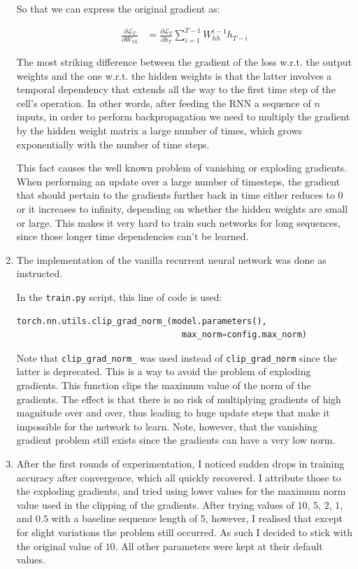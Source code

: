 \documentclass{article}
\newcommand{\del}[2]{\ensuremath{\frac{\partial #1}{\partial #2}}}
\newcommand{\Ell}{\ensuremath{\mathcal{L}}}
\begin{document}
\begin{enumerate}[label=\textbf{1.\arabic*}]
  So that we can express the original gradient as:

  \begin{align*}
    \del{\Ell_T}{W_{hh}} &= \del{\Ell_T}{h_T} \sum_{i=1}^{T-1} W_{hh}^{i-1} h_{T-i}
  \end{align*}

  The most striking difference between the gradient of the loss w.r.t. the output weights and the one w.r.t. the hidden weights is that the latter involves a temporal dependency that extends all the way to the first time step of the cell's operation. In other words, after feeding the RNN a sequence of $n$ inputs, in order to perform backpropagation we need to multiply the gradient by the hidden weight matrix a large number of times, which grows exponentially with the number of time steps.

  This fact causes the well known problem of vanishing or exploding gradients. When performing an update over a large number of timesteps, the gradient that should pertain to the gradients further back in time either reduces to $0$ or it increases to infinity, depending on whether the hidden weights are small or large. This makes it very hard to train such networks for long sequences, since those longer time dependencies can't be learned.

  \item
  The implementation of the vanilla recurrent neural network was done as instructed.

  In the \texttt{train.py} script, this line of code is used:
  \begin{lstlisting}[language=Python]
  torch.nn.utils.clip_grad_norm_(model.parameters(),
                                 max_norm=config.max_norm)
  \end{lstlisting}
  Note that \texttt{clip\_grad\_norm\_} was used instead of \texttt{clip\_grad\_norm} since the latter is deprecated. This is a way to avoid the problem of exploding gradients. This function clips the maximum value of the norm of the gradients. The effect is that there is no risk of multiplying gradients of high magnitude over and over, thus leading to huge update steps that make it impossible for the network to learn. Note, however, that the vanishing gradient problem still exists since the gradients can have a very low norm.

  \item\label{q:vanilla_exp}
  After the first rounds of experimentation, I noticed sudden drops in training accuracy after convergence, which all quickly recovered. I attribute those to the exploding gradients, and tried using lower values for the maximum norm value used in the clipping of the gradients. After trying values of $10$, $5$, $2$, $1$, and $0.5$ with a baseline sequence length of 5, however, I realised that except for slight variations the problem still occurred. As such I decided to stick with the original value of $10$. All other parameters were kept at their default values.


\end{enumerate}
\end{document}
